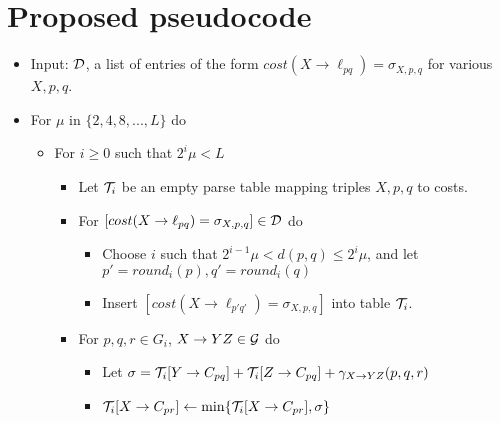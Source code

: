 \documentclass{article}
\begin{document}
\section{Proposed pseudocode}
\begin{itemize}

  \item Input: ${\mathcal D}$, a list of entries of the form $cost(X\to
  \ell_{pq})=\sigma_{X,p,q}$ for various $X,p,q$.
  \item For $\mu$ in $\{2,4,8,...,L\}$ do
  \begin{itemize}

  \item For $i\ge 0$ such that $2^i\mu < L$
  \begin{itemize}
    \item Let ${\mathcal T}_i$ be an empty parse table mapping triples $X,p,q$ to
    costs.
  \end{itemize}

  \begin{itemize}
    \item For $[cost(X\to \ell_{pq})=\sigma_{X,p,q}]\in {\mathcal D}$ do
    \begin{itemize}
      \item Choose $i$ such that $2^{i-1}\mu < d(p,q) \le 2^i \mu$, and let
      $p'=round_i(p), q'=round_i(q)$
      \item Insert $[cost(X\to \ell_{p'q'})=\sigma_{X,p,q}]$ into table
      ${\mathcal T}_i$.
    \end{itemize} 
    \item For $p,q,r \in G_i$, $X\to YZ\in {\mathcal G}$ do
    \begin{itemize}
      \item Let $\sigma = {\mathcal T}_i[Y\to C_{pq}] + {\mathcal T}_i[Z\to C_{pq}] + \gamma_{X\to YZ}(p,q,r)$
      \item ${\mathcal T}_i[X\to C_{pr}] \leftarrow \min \{{\mathcal T}_i[X\to C_{pr}], \sigma \}$
    \end{itemize}  
  \end{itemize}
\end{itemize}
\end{itemize}
\end{document}
